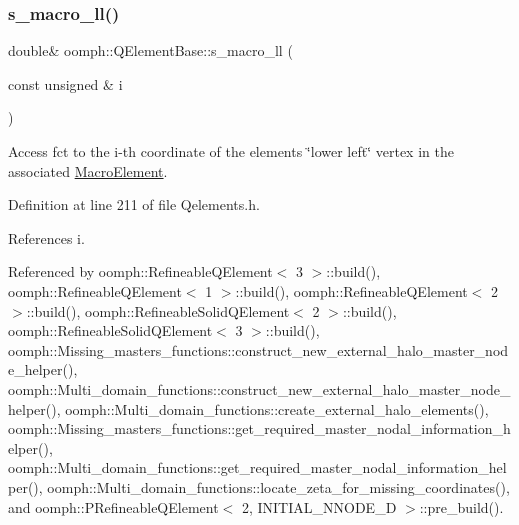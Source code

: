 \subsubsection{\texorpdfstring{s\+\_\+macro\+\_\+ll()}{s\_macro\_ll()}\hspace{0.1cm}{\footnotesize\ttfamily [1/2]}}
{\footnotesize\ttfamily double\& oomph\+::\+Q\+Element\+Base\+::s\+\_\+macro\+\_\+ll (\begin{DoxyParamCaption}\item[{const unsigned \&}]{i }\end{DoxyParamCaption})\hspace{0.3cm}{\ttfamily [inline]}}



Access fct to the i-\/th coordinate of the element\textquotesingle{}s \char`\"{}lower left\char`\"{} vertex in the associated \hyperlink{classoomph_1_1MacroElement}{Macro\+Element}. 



Definition at line 211 of file Qelements.\+h.



References i.



Referenced by oomph\+::\+Refineable\+Q\+Element$<$ 3 $>$\+::build(), oomph\+::\+Refineable\+Q\+Element$<$ 1 $>$\+::build(), oomph\+::\+Refineable\+Q\+Element$<$ 2 $>$\+::build(), oomph\+::\+Refineable\+Solid\+Q\+Element$<$ 2 $>$\+::build(), oomph\+::\+Refineable\+Solid\+Q\+Element$<$ 3 $>$\+::build(), oomph\+::\+Missing\+\_\+masters\+\_\+functions\+::construct\+\_\+new\+\_\+external\+\_\+halo\+\_\+master\+\_\+node\+\_\+helper(), oomph\+::\+Multi\+\_\+domain\+\_\+functions\+::construct\+\_\+new\+\_\+external\+\_\+halo\+\_\+master\+\_\+node\+\_\+helper(), oomph\+::\+Multi\+\_\+domain\+\_\+functions\+::create\+\_\+external\+\_\+halo\+\_\+elements(), oomph\+::\+Missing\+\_\+masters\+\_\+functions\+::get\+\_\+required\+\_\+master\+\_\+nodal\+\_\+information\+\_\+helper(), oomph\+::\+Multi\+\_\+domain\+\_\+functions\+::get\+\_\+required\+\_\+master\+\_\+nodal\+\_\+information\+\_\+helper(), oomph\+::\+Multi\+\_\+domain\+\_\+functions\+::locate\+\_\+zeta\+\_\+for\+\_\+missing\+\_\+coordinates(), and oomph\+::\+P\+Refineable\+Q\+Element$<$ 2, I\+N\+I\+T\+I\+A\+L\+\_\+\+N\+N\+O\+D\+E\+\_\+D $>$\+::pre\+\_\+build().

\mbox{\label{classoomph_1_1QElementBase_aa7fb5176489dad1bc9ab6cb21f1ede5f}} 
